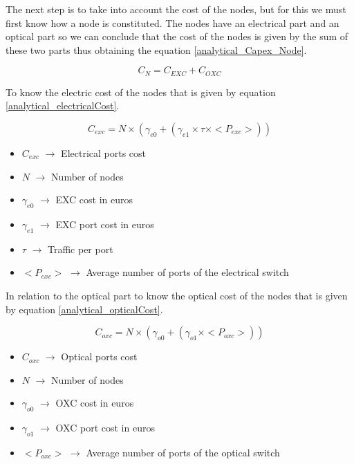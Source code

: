 \vspace{11pt}
The next step is to take into account the cost of the nodes, but for this we must first know how a node is constituted. The nodes have an electrical part and an optical part so we can conclude that the cost of the nodes is given by the sum of these two parts thus obtaining the equation \ref{analytical_Capex_Node}.

\begin{equation}
C_N = C_{EXC} + C_{OXC}
\label{analytical_Capex_Node}
\end{equation}

\vspace{11pt}
To know the electric cost of the nodes that is given by equation \ref{analytical_electricalCost}.

\begin{equation}
C_{exc} = N \times \left( \gamma_{e0} + \left( \gamma_{e1} \times \tau \times <P_{exc}> \right) \right)
\label{analytical_electricalCost}
\end{equation}


\begin{itemize}
\item{$C_{exc}$		$\rightarrow$	Electrical ports cost}
\item{$N$			$\rightarrow$	Number of nodes}
\item{$\gamma_{e0}$	$\rightarrow$	EXC cost in euros}
\item{$\gamma_{e1}$	$\rightarrow$	EXC port cost in euros}
\item{$\tau$		$\rightarrow$	Traffic per port}
\item{$<P_{exc}>$   $\rightarrow$   Average number of ports of the electrical switch}
\end{itemize}

\vspace{11pt}
In relation to the optical part to know the optical cost of the nodes that is given by equation \ref{analytical_opticalCost}.

\begin{equation}
C_{oxc} = N \times \left( \gamma_{o0} + \left( \gamma_{o1} \times <P_{oxc}> \right) \right)
\label{analytical_opticalCost}
\end{equation}


\begin{itemize}
\item{$C_{oxc}$		$\rightarrow$	Optical ports cost}
\item{$N$			$\rightarrow$	Number of nodes}
\item{$\gamma_{o0}$	$\rightarrow$	OXC cost in euros}
\item{$\gamma_{o1}$	$\rightarrow$	OXC port cost in euros}
\item{$<P_{oxc}>$   $\rightarrow$   Average number of ports of the optical switch}
\end{itemize}

